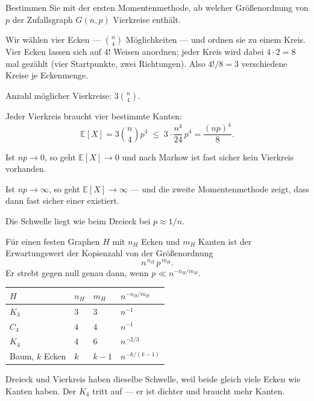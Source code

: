 \begin{aufgabe}
Bestimmen Sie mit der ersten Momentenmethode, ab welcher Größenordnung von $p$ der Zufallsgraph $G(n,p)$ Vierkreise enthält.

\loesung
{}
Wir wählen vier Ecken --- $\binom{n}{4}$ Möglichkeiten --- und ordnen sie zu einem Kreis. Vier Ecken lassen sich auf $4!$ Weisen anordnen; jeder Kreis wird dabei $4 \cdot 2 = 8$ mal gezählt (vier Startpunkte, zwei Richtungen). Also $4!/8 = 3$ verschiedene Kreise je Eckenmenge.

Anzahl möglicher Vierkreise: $3\binom{n}{4}$.

Jeder Vierkreis braucht vier bestimmte Kanten:
\[ \mathbb{E}[X] = 3\binom{n}{4}p^4 \;\le\; 3\cdot\frac{n^4}{24}\,p^4 = \frac{(np)^4}{8} . \]

Ist $np \to 0$, so geht $\mathbb{E}[X] \to 0$ und nach Markow ist fast sicher kein Vierkreis vorhanden.

Ist $np \to \infty$, so geht $\mathbb{E}[X] \to \infty$ --- und die zweite Momentenmethode zeigt, dass dann fast sicher einer existiert.

Die Schwelle liegt wie beim Dreieck bei $p \approx 1/n$.

Für einen festen Graphen $H$ mit $n_H$ Ecken und $m_H$ Kanten ist der Erwartungswert der Kopienzahl von der Größenordnung
\[ n^{\,n_H}\,p^{\,m_H} . \]
Er strebt gegen null genau dann, wenn $p \ll n^{-n_H/m_H}$.

\begin{center}
\renewcommand{\arraystretch}{1.45}
\begin{tabular}{@{}P{2.0cm}P{1.4cm}P{1.4cm}P{2.4cm}@{}}
\toprule
$H$ & $n_H$ & $m_H$ & $n^{-n_H/m_H}$\\
\midrule
$K_3$ & $3$ & $3$ & $n^{-1}$\\
$C_4$ & $4$ & $4$ & $n^{-1}$\\
$K_4$ & $4$ & $6$ & $n^{-2/3}$\\
Baum, $k$ Ecken & $k$ & $k-1$ & $n^{-k/(k-1)}$\\
\bottomrule
\end{tabular}
\end{center}

Dreieck und Vierkreis haben dieselbe Schwelle, weil beide gleich viele Ecken wie Kanten haben. Der $K_4$ tritt  auf --- er ist dichter und braucht mehr Kanten.

\begin{center}
\begin{minipage}{0.86\textwidth}
\end{minipage}
\end{center}
\end{aufgabe}


